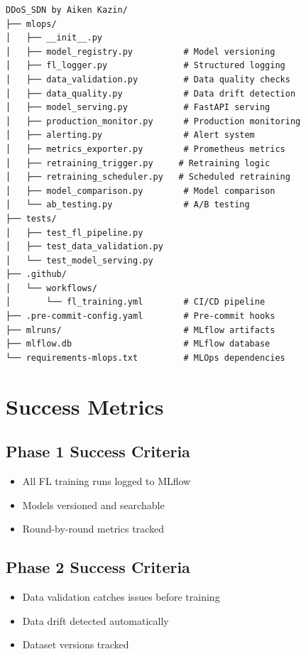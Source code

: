 \documentclass[12pt]{article}
\begin{document}
\begin{lstlisting}[language=text]
DDoS_SDN by Aiken Kazin/
├── mlops/
│   ├── __init__.py
│   ├── model_registry.py          # Model versioning
│   ├── fl_logger.py               # Structured logging
│   ├── data_validation.py         # Data quality checks
│   ├── data_quality.py            # Data drift detection
│   ├── model_serving.py           # FastAPI serving
│   ├── production_monitor.py      # Production monitoring
│   ├── alerting.py                # Alert system
│   ├── metrics_exporter.py        # Prometheus metrics
│   ├── retraining_trigger.py     # Retraining logic
│   ├── retraining_scheduler.py   # Scheduled retraining
│   ├── model_comparison.py        # Model comparison
│   └── ab_testing.py              # A/B testing
├── tests/
│   ├── test_fl_pipeline.py
│   ├── test_data_validation.py
│   └── test_model_serving.py
├── .github/
│   └── workflows/
│       └── fl_training.yml        # CI/CD pipeline
├── .pre-commit-config.yaml        # Pre-commit hooks
├── mlruns/                        # MLflow artifacts
├── mlflow.db                      # MLflow database
└── requirements-mlops.txt         # MLOps dependencies
\end{lstlisting}

\section{Success Metrics}

\subsection{Phase 1 Success Criteria}
\begin{itemize}
    \item All FL training runs logged to MLflow
    \item Models versioned and searchable
    \item Round-by-round metrics tracked
\end{itemize}

\subsection{Phase 2 Success Criteria}
\begin{itemize}
    \item Data validation catches issues before training
    \item Data drift detected automatically
    \item Dataset versions tracked
\end{itemize}
\end{document}
